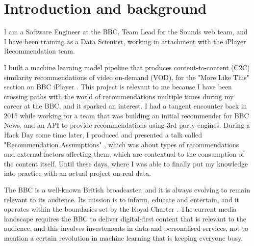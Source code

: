 
\section{Introduction and background}

I am a Software Engineer at the BBC, Team Lead for the Sounds web team, and I have been training as a Data Scientist,
working in attachment with the iPlayer Recommendation team.

I built a machine learning model pipeline that produces content-to-content (C2C) similarity recommendations
of video on-demand (VOD), for the "More Like This" section on BBC iPlayer \cite{BBC:MoreLikeBluey}.
This project is relevant to me because I have been crossing paths with the world of recommendations
multiple times during my career at the BBC, and it sparked an interest.
I had a tangent encounter back in 2015 while working for a team that was building
an initial recommender for BBC News, and an API to provide recommendations using 3rd party engines.
During a Hack Day some time later, I produced and presented a talk called
"Recommendation Assumptions" \cite{RecsAssumptions}, which was about types of recommendations and external factors affecting
them, which are contextual to the consumption of the content itself. Until these days, where I was able to finally put my knowledge into practice
with an actual project on real data.

The BBC is a well-known British broadcaster, and it is always evolving to remain relevant to its audience. Its mission
is to inform, educate and entertain, and it operates within the boundaries set by the Royal Charter \cite{BBC:RoyalCharter}.
The current media landscape requires the BBC to deliver digital-first content that is relevant to the audience,
and this involves investements in data and personalised services, not to mention a certain revolution in machine learning
that is keeping everyone busy.
